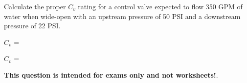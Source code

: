 

Calculate the proper $C_v$ rating for a control valve expected to flow 350 GPM of water when wide-open with an upstream pressure of 50 PSI and a downstream pressure of 22 PSI.

\vskip 10pt

$C_v$ = \underbar{\hskip 50pt}







$C_v$ = 







{\bf This question is intended for exams only and not worksheets!}.




